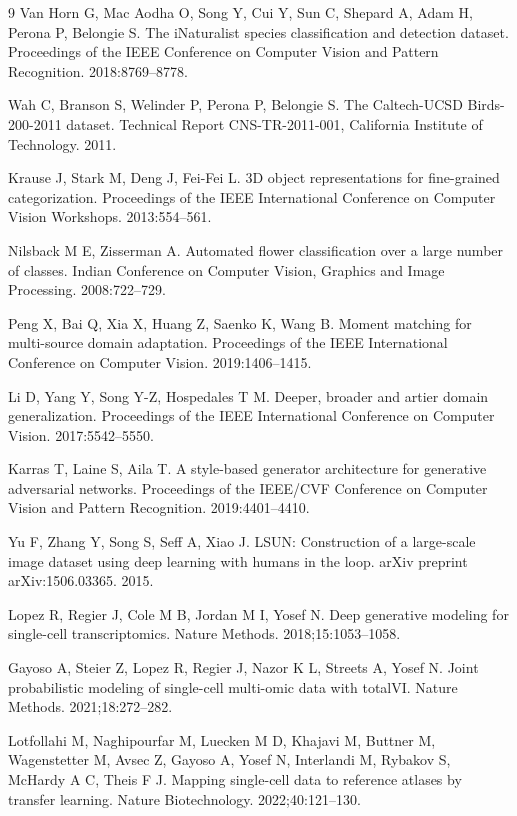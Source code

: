 \documentclass[preprint,12pt,number]{elsarticle}
\begin{document}
\begin{thebibliography}{9}
Van Horn G, Mac Aodha O, Song Y, Cui Y, Sun C, Shepard A, Adam H, Perona P, Belongie S. The iNaturalist species classification and detection dataset. Proceedings of the IEEE Conference on Computer Vision and Pattern Recognition. 2018:8769--8778.

Wah C, Branson S, Welinder P, Perona P, Belongie S. The Caltech-UCSD Birds-200-2011 dataset. Technical Report CNS-TR-2011-001, California Institute of Technology. 2011.

Krause J, Stark M, Deng J, Fei-Fei L. 3D object representations for fine-grained categorization. Proceedings of the IEEE International Conference on Computer Vision Workshops. 2013:554--561.

Nilsback M E, Zisserman A. Automated flower classification over a large number of classes. Indian Conference on Computer Vision, Graphics and Image Processing. 2008:722--729.

Peng X, Bai Q, Xia X, Huang Z, Saenko K, Wang B. Moment matching for multi-source domain adaptation. Proceedings of the IEEE International Conference on Computer Vision. 2019:1406--1415.

Li D, Yang Y, Song Y-Z, Hospedales T M. Deeper, broader and artier domain generalization. Proceedings of the IEEE International Conference on Computer Vision. 2017:5542--5550.

Karras T, Laine S, Aila T. A style-based generator architecture for generative adversarial networks. Proceedings of the IEEE/CVF Conference on Computer Vision and Pattern Recognition. 2019:4401--4410.

Yu F, Zhang Y, Song S, Seff A, Xiao J. LSUN: Construction of a large-scale image dataset using deep learning with humans in the loop. arXiv preprint arXiv:1506.03365. 2015.

Lopez R, Regier J, Cole M B, Jordan M I, Yosef N. Deep generative modeling for single-cell transcriptomics. Nature Methods. 2018;15:1053--1058.

Gayoso A, Steier Z, Lopez R, Regier J, Nazor K L, Streets A, Yosef N. Joint probabilistic modeling of single-cell multi-omic data with totalVI. Nature Methods. 2021;18:272--282.

Lotfollahi M, Naghipourfar M, Luecken M D, Khajavi M, Buttner M, Wagenstetter M, Avsec Z, Gayoso A, Yosef N, Interlandi M, Rybakov S, McHardy A C, Theis F J. Mapping single-cell data to reference atlases by transfer learning. Nature Biotechnology. 2022;40:121--130.


\end{thebibliography}
\end{document}
